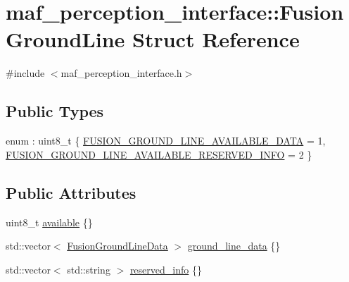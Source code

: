 \hypertarget{structmaf__perception__interface_1_1FusionGroundLine}{}\section{maf\+\_\+perception\+\_\+interface\+:\+:Fusion\+Ground\+Line Struct Reference}
\label{structmaf__perception__interface_1_1FusionGroundLine}


{\ttfamily \#include $<$maf\+\_\+perception\+\_\+interface.\+h$>$}

\subsection*{Public Types}
\begin{DoxyCompactItemize}
\item 
enum \+: uint8\+\_\+t \{ \hyperlink{structmaf__perception__interface_1_1FusionGroundLine_aab1e7e94015872be30f4face9699cf56a6f33b01272b68d17614b44888941a170}{F\+U\+S\+I\+O\+N\+\_\+\+G\+R\+O\+U\+N\+D\+\_\+\+L\+I\+N\+E\+\_\+\+A\+V\+A\+I\+L\+A\+B\+L\+E\+\_\+\+D\+A\+TA} = 1, 
\hyperlink{structmaf__perception__interface_1_1FusionGroundLine_aab1e7e94015872be30f4face9699cf56ae01e3fe8b6aeea775027c16cfd8ae596}{F\+U\+S\+I\+O\+N\+\_\+\+G\+R\+O\+U\+N\+D\+\_\+\+L\+I\+N\+E\+\_\+\+A\+V\+A\+I\+L\+A\+B\+L\+E\+\_\+\+R\+E\+S\+E\+R\+V\+E\+D\+\_\+\+I\+N\+FO} = 2
 \}
\end{DoxyCompactItemize}
\subsection*{Public Attributes}
\begin{DoxyCompactItemize}
\item 
uint8\+\_\+t \hyperlink{structmaf__perception__interface_1_1FusionGroundLine_af0fb1b26ed089a250dc485f65d375bbd}{available} \{\}
\item 
std\+::vector$<$ \hyperlink{structmaf__perception__interface_1_1FusionGroundLineData}{Fusion\+Ground\+Line\+Data} $>$ \hyperlink{structmaf__perception__interface_1_1FusionGroundLine_ae3e6da3331f37459d3bca979a8b762a8}{ground\+\_\+line\+\_\+data} \{\}
\item 
std\+::vector$<$ std\+::string $>$ \hyperlink{structmaf__perception__interface_1_1FusionGroundLine_ab4296d7c5667bf6015673967ea66718a}{reserved\+\_\+info} \{\}
\end{DoxyCompactItemize}


